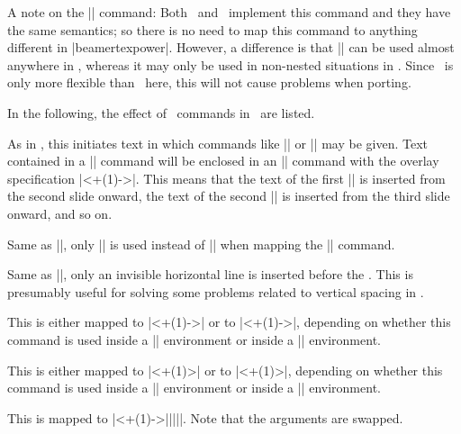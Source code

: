 A note on the |\pause| command: Both \beamer\ and \texpower\ implement this command and they have the same semantics; so there is no need to map this command to anything different in |beamertexpower|. However, a difference is that |\pause| can be used almost anywhere in \beamer, whereas it may only be used in non-nested situations in \texpower. Since \beamer\ is only more flexible than \texpower\ here, this will not cause problems when porting.

In the following, the effect of \texpower\ commands in \beamer\ are listed.

\begin{command}{\stepwise{}}
  As in \texpower, this initiates text in which commands like |\step| or |\switch| may be given. Text contained in a |\step| command will be enclosed in an |\only| command with the overlay specification |<+(1)->|. This means that the text of the first |\step| is inserted from the second slide onward, the text of the second |\step| is inserted from the third slide onward, and so on.
\end{command}

\begin{command}{\parstepwise{}}
  Same as |\stepwise|, only |\uncover| is used instead of |\only| when mapping the |\step| command.
\end{command}

\begin{command}{\liststepwise{}}
  Same as |\stepwise|, only an invisible horizontal line is inserted before the . This is presumably useful for solving some problems related to vertical spacing in \texpower.
\end{command}

\begin{command}{\step{}}
  This is either mapped to |\only<+(1)->| or to |\uncover<+(1)->|, depending on whether this command is used inside a |\stepwise| environment or inside a |\parstepwise| environment.
\end{command}

\begin{command}{\steponce{}}
  This is either mapped to |\only<+(1)>| or to |\uncover<+(1)>|, depending on whether this command is used inside a |\stepwise| environment or inside a |\parstepwise| environment.
\end{command}

\begin{command}{\switch{}}
  This is mapped to |\alt<+(1)->{||}{||}|. Note that the arguments are swapped.
\end{command}

